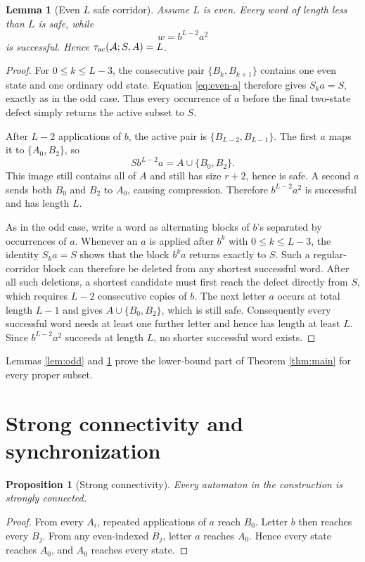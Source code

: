 \documentclass[11pt]{article}
\newtheorem{lemma}{Lemma}
\newtheorem{proposition}{Proposition}
\theoremstyle{definition}
\theoremstyle{remark}
\newcommand{\Acal}{\mathcal A}
\newcommand{\tauac}{\tau_{\rm ac}}
\begin{document}
\begin{lemma}[Even $L$ safe corridor]\label{lem:even}
Assume $L$ is even. Every word of length less than $L$ is safe, while
\[
w=b^{L-2}a^2
\]
is successful. Hence $\tauac(\Acal;S,A)=L$.
\end{lemma}
\begin{proof}
For $0\le k\le L-3$, the consecutive pair $\{B_k,B_{k+1}\}$ contains one even state and one ordinary odd state. Equation \eqref{eq:even-a} therefore gives $S_k a=S$, exactly as in the odd case. Thus every occurrence of $a$ before the final two-state defect simply returns the active subset to $S$.

After $L-2$ applications of $b$, the active pair is $\{B_{L-2},B_{L-1}\}$. The first $a$ maps it to $\{A_0,B_2\}$, so
\[
S b^{L-2}a=A\cup\{B_0,B_2\}.
\]
This image still contains all of $A$ and still has size $r+2$, hence is safe. A second $a$ sends both $B_0$ and $B_2$ to $A_0$, causing compression. Therefore $b^{L-2}a^2$ is successful and has length $L$.

As in the odd case, write a word as alternating blocks of $b$'s separated by occurrences of $a$. Whenever an $a$ is applied after $b^k$ with $0\le k\le L-3$, the identity $S_k a=S$ shows that the block $b^k a$ returns exactly to $S$. Such a regular-corridor block can therefore be deleted from any shortest successful word. After all such deletions, a shortest candidate must first reach the defect directly from $S$, which requires $L-2$ consecutive copies of $b$. The next letter $a$ occurs at total length $L-1$ and gives $A\cup\{B_0,B_2\}$, which is still safe. Consequently every successful word needs at least one further letter and hence has length at least $L$. Since $b^{L-2}a^2$ succeeds at length $L$, no shorter successful word exists.
\end{proof}

Lemmas \ref{lem:odd} and \ref{lem:even} prove the lower-bound part of Theorem \ref{thm:main} for every proper subset.

\section{Strong connectivity and synchronization}
\begin{proposition}[Strong connectivity]\label{prop:sc}
Every automaton in the construction is strongly connected.
\end{proposition}
\begin{proof}
From every $A_i$, repeated applications of $a$ reach $B_0$. Letter $b$ then reaches every $B_j$. From any even-indexed $B_j$, letter $a$ reaches $A_0$. Hence every state reaches $A_0$, and $A_0$ reaches every state.
\end{proof}
\end{document}
